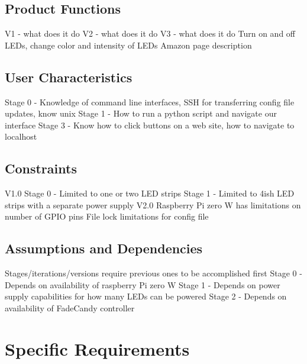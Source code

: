 \documentclass[onecolumn, draftclsnofoot,10pt, compsoc]{IEEEtran}
\begin{document}
		\subsection*{Product Functions}
		V1 - what does it do
		V2 - what does it do
		V3 - what does it do
		Turn on and off LEDs, change color and intensity of LEDs
		Amazon page description

		\subsection*{User Characteristics}
		Stage 0 - Knowledge of command line interfaces, SSH for transferring config file updates, know unix
		Stage 1 - How to run a python script and navigate our interface
		Stage 3 - Know how to click buttons on a web site, how to navigate to localhost

		\subsection*{Constraints}
		V1.0
		Stage 0 - Limited to one or two LED strips
		Stage 1 - Limited to 4ish LED strips with a separate power supply
		V2.0
		Raspberry Pi zero W has limitations on number of GPIO pins
		File lock limitations for config file

		\subsection*{Assumptions and Dependencies}
		Stages/iterations/versions require previous ones to be accomplished first
		Stage 0 - Depends on availability of raspberry Pi zero W
		Stage 1 - Depends on power supply capabilities for how many LEDs can be powered
		Stage 2 - Depends on availability of FadeCandy controller

	\section*{Specific Requirements}
\end{document}
